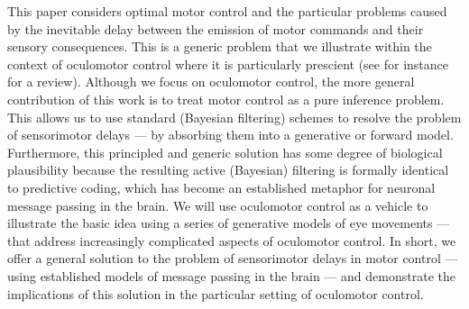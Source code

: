 \documentclass[a4paper]{article} %
\begin{document}
This paper considers optimal motor control and the particular problems caused by the inevitable delay between the emission of motor commands and their sensory consequences. This is a generic problem that we illustrate within the context of oculomotor control where it is particularly prescient (see for instance~\citep{Nijhawan08} for a review). Although we focus on oculomotor control, the more general contribution of this work is to treat motor control as a pure inference problem. This allows us to use standard (Bayesian filtering) schemes to resolve the problem of sensorimotor delays --- by absorbing them into a generative or forward model. Furthermore, this principled and generic solution has some degree of biological plausibility because the resulting active (Bayesian) filtering is formally identical to predictive coding, which has become an established metaphor for neuronal message passing in the brain. We will use oculomotor control as a vehicle to illustrate the basic idea using a series of generative models of eye movements --- that address increasingly complicated aspects of oculomotor control. In short, we offer a general solution to the problem of sensorimotor delays in motor control --- using established models of message passing in the brain --- and demonstrate the implications of this solution in the particular setting of oculomotor control.
\end{document}
